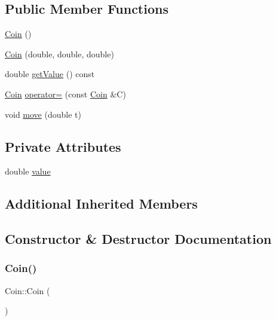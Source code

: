 \subsection*{Public Member Functions}
\begin{DoxyCompactItemize}
\item 
\mbox{\hyperlink{class_coin_a94b2130e2d3ac956ba47271ad81c64f5}{Coin}} ()
\item 
\mbox{\hyperlink{class_coin_ad9c43b40a4d31b251225e44cac231679}{Coin}} (double, double, double)
\item 
double \mbox{\hyperlink{class_coin_a53cbddb74ac97ec54ec40f09beab3332}{get\+Value}} () const
\item 
\mbox{\hyperlink{class_coin}{Coin}} \mbox{\hyperlink{class_coin_adaf4dcbe15a8d4549b4ccdaaca18c9bb}{operator=}} (const \mbox{\hyperlink{class_coin}{Coin}} \&C)
\item 
void \mbox{\hyperlink{class_coin_a58a2a28aa6c21f0045983755dad015dc}{move}} (double t)
\end{DoxyCompactItemize}
\subsection*{Private Attributes}
\begin{DoxyCompactItemize}
\item 
double \mbox{\hyperlink{class_coin_ada7dce9fece24cd203828ec6399b7a86}{value}}
\end{DoxyCompactItemize}
\subsection*{Additional Inherited Members}


\subsection{Constructor \& Destructor Documentation}
\mbox{\label{class_coin_a94b2130e2d3ac956ba47271ad81c64f5}} 
\subsubsection{\texorpdfstring{Coin()}{Coin()}\hspace{0.1cm}{\footnotesize\ttfamily [1/2]}}
{\footnotesize\ttfamily Coin\+::\+Coin (\begin{DoxyParamCaption}{ }\end{DoxyParamCaption})}

